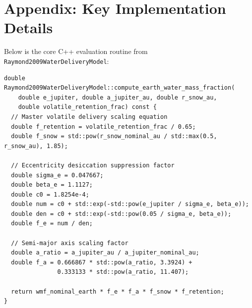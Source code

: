 \documentclass[11pt,a4paper]{article}
\begin{document}
\section*{Appendix: Key Implementation Details}
Below is the core C++ evaluation routine from \texttt{Raymond2009WaterDeliveryModel}:
\begin{verbatim}
double Raymond2009WaterDeliveryModel::compute_earth_water_mass_fraction(
    double e_jupiter, double a_jupiter_au, double r_snow_au,
    double volatile_retention_frac) const {
  // Master volatile delivery scaling equation
  double f_retention = volatile_retention_frac / 0.65;
  double f_snow = std::pow(r_snow_nominal_au / std::max(0.5, r_snow_au), 1.85);
  
  // Eccentricity desiccation suppression factor
  double sigma_e = 0.047667;
  double beta_e = 1.1127;
  double c0 = 1.8254e-4;
  double num = c0 + std::exp(-std::pow(e_jupiter / sigma_e, beta_e));
  double den = c0 + std::exp(-std::pow(0.05 / sigma_e, beta_e));
  double f_e = num / den;

  // Semi-major axis scaling factor
  double a_ratio = a_jupiter_au / a_jupiter_nominal_au;
  double f_a = 0.666867 * std::pow(a_ratio, 3.3924) +
               0.333133 * std::pow(a_ratio, 11.407);

  return wmf_nominal_earth * f_e * f_a * f_snow * f_retention;
}
\end{verbatim}
\end{document}
